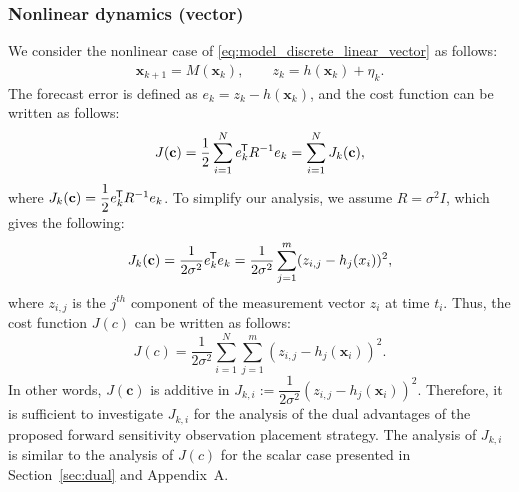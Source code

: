 \documentclass{article}
\newcommand*{\tran}{^{\mkern-1.5mu\mathsf{T}}}
\begin{document}
\subsubsection{Nonlinear dynamics (vector)}
\textcolor{rev}{We consider the nonlinear case of \cref{eq:model_discrete_linear_vector} as follows:
\begin{equation}
    \begin{aligned}
        \mathbf{x}_{k+1} = M(\mathbf{x}_k), \qquad 
        z_k = h(\mathbf{x}_k) + \eta_k.
    \end{aligned}
\end{equation}
The forecast error is defined as $e_k = z_k - h(\mathbf{x}_k)$, and the cost function can be written as follows:
\begin{equation}
    J(\mathbf{c}) = \dfrac{1}{2} \sum_{i=1}^N e_k\tran R^{-1} e_k = \sum_{i=1}^N J_k(\mathbf{c}),
\end{equation} 
where $J_k(\mathbf{c}) = \dfrac{1}{2} e_k\tran R^{-1} e_k$. To simplify our analysis, we assume $R = \sigma^2 I$, which gives the following:
\begin{equation}
    \begin{aligned}
        J_k(\mathbf{c}) = \dfrac{1}{2\sigma^2} e_k\tran e_k = \dfrac{1}{2\sigma^2} \sum_{j=1}^m (z_{i,j} - h_j(x_i))^2,
    \end{aligned}
\end{equation}
where $z_{i,j}$ is the $j^{th}$ component of the measurement vector $z_i$ at time $t_i$. Thus, the cost function $J(c)$ can be written as follows:
\begin{equation}
    J(c) = \dfrac{1}{2\sigma^2} \sum_{i=1}^N \sum_{j=1}^m (z_{i,j} - h_j(\mathbf{x}_i))^2.
\end{equation}
In other words, $J(\mathbf{c})$ is additive in $J_{k,i} := \dfrac{1}{2\sigma^2} (z_{i,j} - h_j(\mathbf{x}_i))^2 $. Therefore, it is sufficient to investigate $J_{k,i}$ for the analysis of the dual advantages of the proposed forward sensitivity observation placement strategy. The analysis of $J_{k,i}$ is similar to the analysis of $J(c)$ for the scalar case presented in Section~\ref{sec:dual} and Appendix~A.}



\end{document}
